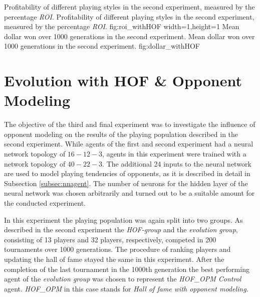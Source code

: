   {Profitability of different playing styles in the second experiment, measured by the percentage \textit{ROI}.}%
  {Profitability of different playing styles in the second experiment, measured by the percentage \textit{ROI}.}%
  {fig:roi_withHOF}%
  {width=1\textwidth,height=1\textheight}%
  {Mean dollar won over 1000 generations in the second experiment.}%
  {Mean dollar won over 1000 generations in the second experiment.}%
  {fig:dollar_withHOF}%
\pagebreak
\section{Evolution with HOF \& Opponent Modeling}
The objective of the third and final experiment was to investigate the influence of opponent modeling on the results of the playing population described in the second experiment. While agents of the first and second experiment had a neural network topology of $16-12-3$, agents in this experiment were trained with a network topology of $40-22-3$. The additional 24 inputs to the neural network are used to model playing tendencies of opponents, as it is described in detail in Subsection \ref{subsec:nnagent}. The number of neurons for the hidden layer of the neural network was chosen arbitrarily and turned out to be a suitable amount for the conducted experiment. \par
In this experiment the playing population was again split into two groups. As described in the second experiment the \textit{HOF-group} and the \textit{evolution group}, consisting of 13 players and 32 players, respectively, competed in 200 tournaments over 1000 generations. The procedure of ranking players and updating the hall of fame stayed the same in this experiment. After the completion of the last tournament in the 1000th generation the best performing agent of the \textit{evolution group} was chosen to represent the \textit{HOF\_OPM Control} agent. \textit{HOF\_OPM} in this case stands for \textit{Hall of fame with opponent modeling}.
